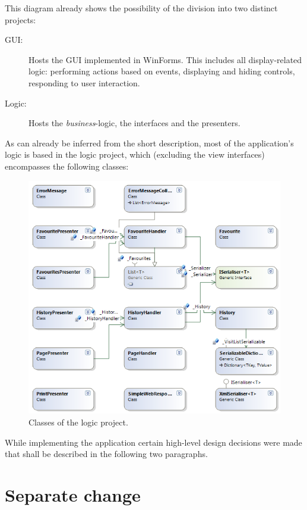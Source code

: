 This diagram already shows the possibility of the division into two distinct projects:

\begin{description}
\item[GUI:] Hosts the \ac{GUI} implemented in WinForms. This includes all display-related logic: performing actions based on events, displaying and hiding controls, responding to user interaction.
\item[Logic:] Hosts the \textit{business}-logic, the interfaces and the presenters.
\end{description}

As can already be inferred from the short description, most of the application's logic is based in the logic project, which (excluding the view interfaces) encompasses the following classes:

\begin{figure}[H]
\begin{center}
\includegraphics[width=\textwidth]{gfx/class_diagram.png}
\caption{Classes of the logic project.}
\label{fig:mvp}
\end{center}
\end{figure}

While implementing the application certain high-level design decisions were made that shall be described in the following two paragraphs.

\section{Separate change}
\label{subsec:separate_change}

